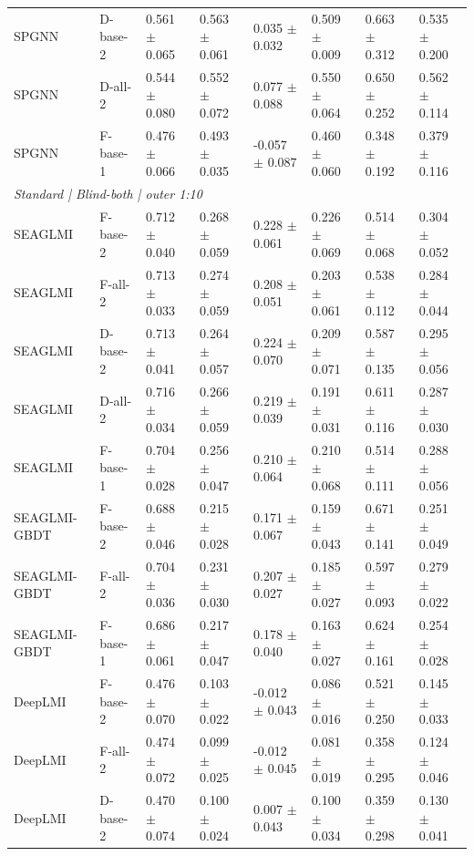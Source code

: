 \begin{landscape}
{\begin{longtable}{llllllll}
SPGNN & D-base-2 & 0.561 $\pm$ 0.065 & 0.563 $\pm$ 0.061 & 0.035 $\pm$ 0.032 & 0.509 $\pm$ 0.009 & 0.663 $\pm$ 0.312 & 0.535 $\pm$ 0.200 \\
SPGNN & D-all-2 & 0.544 $\pm$ 0.080 & 0.552 $\pm$ 0.072 & 0.077 $\pm$ 0.088 & 0.550 $\pm$ 0.064 & 0.650 $\pm$ 0.252 & 0.562 $\pm$ 0.114 \\
SPGNN & F-base-1 & 0.476 $\pm$ 0.066 & 0.493 $\pm$ 0.035 & -0.057 $\pm$ 0.087 & 0.460 $\pm$ 0.060 & 0.348 $\pm$ 0.192 & 0.379 $\pm$ 0.116 \\
\multicolumn{8}{l}{\textit{Standard | Blind-both | outer 1:10}}\\
SEAGLMI & F-base-2 & 0.712 $\pm$ 0.040 & 0.268 $\pm$ 0.059 & 0.228 $\pm$ 0.061 & 0.226 $\pm$ 0.069 & 0.514 $\pm$ 0.068 & 0.304 $\pm$ 0.052 \\
SEAGLMI & F-all-2 & 0.713 $\pm$ 0.033 & 0.274 $\pm$ 0.059 & 0.208 $\pm$ 0.051 & 0.203 $\pm$ 0.061 & 0.538 $\pm$ 0.112 & 0.284 $\pm$ 0.044 \\
SEAGLMI & D-base-2 & 0.713 $\pm$ 0.041 & 0.264 $\pm$ 0.057 & 0.224 $\pm$ 0.070 & 0.209 $\pm$ 0.071 & 0.587 $\pm$ 0.135 & 0.295 $\pm$ 0.056 \\
SEAGLMI & D-all-2 & 0.716 $\pm$ 0.034 & 0.266 $\pm$ 0.059 & 0.219 $\pm$ 0.039 & 0.191 $\pm$ 0.031 & 0.611 $\pm$ 0.116 & 0.287 $\pm$ 0.030 \\
SEAGLMI & F-base-1 & 0.704 $\pm$ 0.028 & 0.256 $\pm$ 0.047 & 0.210 $\pm$ 0.064 & 0.210 $\pm$ 0.068 & 0.514 $\pm$ 0.111 & 0.288 $\pm$ 0.056 \\
SEAGLMI-GBDT & F-base-2 & 0.688 $\pm$ 0.046 & 0.215 $\pm$ 0.028 & 0.171 $\pm$ 0.067 & 0.159 $\pm$ 0.043 & 0.671 $\pm$ 0.141 & 0.251 $\pm$ 0.049 \\
SEAGLMI-GBDT & F-all-2 & 0.704 $\pm$ 0.036 & 0.231 $\pm$ 0.030 & 0.207 $\pm$ 0.027 & 0.185 $\pm$ 0.027 & 0.597 $\pm$ 0.093 & 0.279 $\pm$ 0.022 \\
SEAGLMI-GBDT & F-base-1 & 0.686 $\pm$ 0.061 & 0.217 $\pm$ 0.047 & 0.178 $\pm$ 0.040 & 0.163 $\pm$ 0.027 & 0.624 $\pm$ 0.161 & 0.254 $\pm$ 0.028 \\
DeepLMI & F-base-2 & 0.476 $\pm$ 0.070 & 0.103 $\pm$ 0.022 & -0.012 $\pm$ 0.043 & 0.086 $\pm$ 0.016 & 0.521 $\pm$ 0.250 & 0.145 $\pm$ 0.033 \\
DeepLMI & F-all-2 & 0.474 $\pm$ 0.072 & 0.099 $\pm$ 0.025 & -0.012 $\pm$ 0.045 & 0.081 $\pm$ 0.019 & 0.358 $\pm$ 0.295 & 0.124 $\pm$ 0.046 \\
DeepLMI & D-base-2 & 0.470 $\pm$ 0.074 & 0.100 $\pm$ 0.024 & 0.007 $\pm$ 0.043 & 0.100 $\pm$ 0.034 & 0.359 $\pm$ 0.298 & 0.130 $\pm$ 0.041 \\

\end{longtable}}
\end{landscape}

